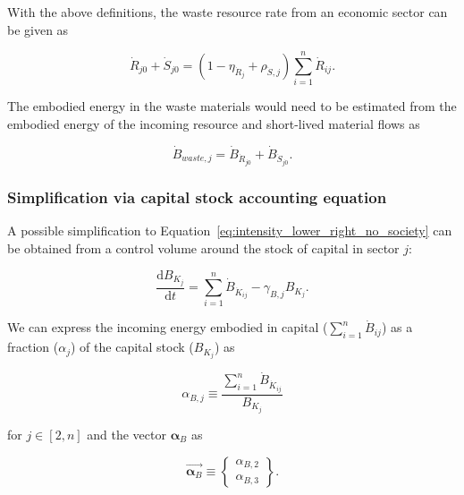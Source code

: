 With the above definitions, the waste resource rate from an economic sector
can be given as

\begin{equation}
	\dot{R}_{j0} + \dot{S}_{j0}
	= (1 - \eta_{\dot{R}_{j}} + \rho_{\dot{S},j}) \sum\limits_{i=1}^{n} \dot{R}_{ij}.
\end{equation}

\noindent{}The embodied energy in the waste materials would need to be estimated
from the embodied energy of the incoming resource and short-lived material flows as

\begin{equation}
	\dot{B}_{waste,j}
	= \dot{B}_{\dot{R}_{j0}} + \dot{B}_{\dot{S}_{j0}}.
\end{equation}


\subsubsection{Simplification via capital stock accounting equation}
\label{sec:capital_accounting}

A possible simplification to Equation~\ref{eq:intensity_lower_right_no_society}
can be obtained from a control volume around the stock of capital in sector $j$:

\begin{equation}
	\frac{\mathrm{d}B_{K_{j}}}{\mathrm{d}t}
	= \sum\limits_{i=1}^{n} \dot{B}_{\dot{K}_{ij}} 
	- \gamma_{B,j} B_{K_{j}}.
\end{equation}

We can express the incoming energy embodied in capital ($\sum_{i=1}^{n} \dot{B}_{ij}$)
as a fraction ($\alpha_{j}$) of the capital stock ($B_{K_{j}}$) as

\begin{equation}
	\alpha_{B,j}
	\equiv 
	\frac{\sum\limits_{i=1}^{n} \dot{B}_{\dot{K}_{ij}}} {B_{K_{j}}}
\end{equation}

\noindent{}for $j \in [2,n]$ and the vector $\boldsymbol{\alpha}_{B}$ as

\begin{equation}
	\vec{\boldsymbol{\alpha}_{B}}
	\equiv
	\begin{Bmatrix}
		\alpha_{B,2}	\\
		\alpha_{B,3}
	\end{Bmatrix}.
\end{equation}

